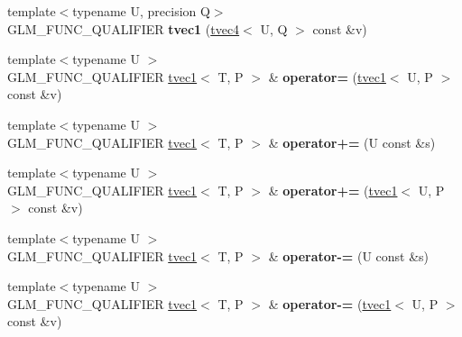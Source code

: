 \begin{DoxyCompactItemize}
\item 
\hypertarget{structglm_1_1detail_1_1tvec1_afc81da6a984943c6e773834ab7fc75f0}{{\footnotesize template$<$typename U, precision Q$>$ }\\G\-L\-M\-\_\-\-F\-U\-N\-C\-\_\-\-Q\-U\-A\-L\-I\-F\-I\-E\-R {\bfseries tvec1} (\hyperlink{structglm_1_1detail_1_1tvec4}{tvec4}$<$ U, Q $>$ const \&v)}\label{structglm_1_1detail_1_1tvec1_afc81da6a984943c6e773834ab7fc75f0}

\item 
\hypertarget{structglm_1_1detail_1_1tvec1_afdd165d59a6a8369e37b85676929e05d}{{\footnotesize template$<$typename U $>$ }\\G\-L\-M\-\_\-\-F\-U\-N\-C\-\_\-\-Q\-U\-A\-L\-I\-F\-I\-E\-R \hyperlink{structglm_1_1detail_1_1tvec1}{tvec1}$<$ T, P $>$ \& {\bfseries operator=} (\hyperlink{structglm_1_1detail_1_1tvec1}{tvec1}$<$ U, P $>$ const \&v)}\label{structglm_1_1detail_1_1tvec1_afdd165d59a6a8369e37b85676929e05d}

\item 
\hypertarget{structglm_1_1detail_1_1tvec1_ac367841556827c8b6a27e242490a7eef}{{\footnotesize template$<$typename U $>$ }\\G\-L\-M\-\_\-\-F\-U\-N\-C\-\_\-\-Q\-U\-A\-L\-I\-F\-I\-E\-R \hyperlink{structglm_1_1detail_1_1tvec1}{tvec1}$<$ T, P $>$ \& {\bfseries operator+=} (U const \&s)}\label{structglm_1_1detail_1_1tvec1_ac367841556827c8b6a27e242490a7eef}

\item 
\hypertarget{structglm_1_1detail_1_1tvec1_a7513234bbb5711f30b59e0c94d8b0c46}{{\footnotesize template$<$typename U $>$ }\\G\-L\-M\-\_\-\-F\-U\-N\-C\-\_\-\-Q\-U\-A\-L\-I\-F\-I\-E\-R \hyperlink{structglm_1_1detail_1_1tvec1}{tvec1}$<$ T, P $>$ \& {\bfseries operator+=} (\hyperlink{structglm_1_1detail_1_1tvec1}{tvec1}$<$ U, P $>$ const \&v)}\label{structglm_1_1detail_1_1tvec1_a7513234bbb5711f30b59e0c94d8b0c46}

\item 
\hypertarget{structglm_1_1detail_1_1tvec1_a67d5463cd82056cfaaedab976195e362}{{\footnotesize template$<$typename U $>$ }\\G\-L\-M\-\_\-\-F\-U\-N\-C\-\_\-\-Q\-U\-A\-L\-I\-F\-I\-E\-R \hyperlink{structglm_1_1detail_1_1tvec1}{tvec1}$<$ T, P $>$ \& {\bfseries operator-\/=} (U const \&s)}\label{structglm_1_1detail_1_1tvec1_a67d5463cd82056cfaaedab976195e362}

\item 
\hypertarget{structglm_1_1detail_1_1tvec1_af596a5a7f5b2ea079cd85d576b62e326}{{\footnotesize template$<$typename U $>$ }\\G\-L\-M\-\_\-\-F\-U\-N\-C\-\_\-\-Q\-U\-A\-L\-I\-F\-I\-E\-R \hyperlink{structglm_1_1detail_1_1tvec1}{tvec1}$<$ T, P $>$ \& {\bfseries operator-\/=} (\hyperlink{structglm_1_1detail_1_1tvec1}{tvec1}$<$ U, P $>$ const \&v)}\label{structglm_1_1detail_1_1tvec1_af596a5a7f5b2ea079cd85d576b62e326}


\end{DoxyCompactItemize}
